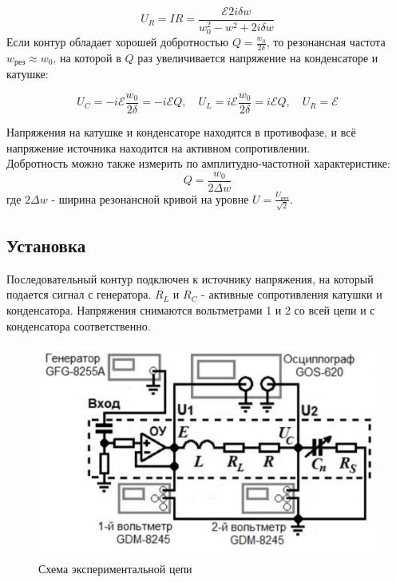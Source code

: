 \documentclass[a4paper, 12pt]{article}
\begin{document}
\begin{equation}
    U_R = IR = \frac{\mathcal{E} 2i\delta w}{w_0^2 - w^2 + 2i\delta w}
\end{equation}
Если контур обладает хорошей добротностью $Q = \frac{w_0}{2\delta}$, то резонансная частота $w_\text{рез} \approx w_0$, на которой в $Q$ раз увеличивается напряжение на конденсаторе и катушке:

\begin{equation}
    U_C = -i\mathcal{E} \frac{w_0}{2\delta} = -i\mathcal{E} Q, \quad U_L = i\mathcal{E} \frac{w_0}{2\delta} = i\mathcal{E} Q, \quad U_R = \mathcal{E}
\end{equation}

Напряжения на катушке и конденсаторе находятся в противофазе, и всё напряжение источника находится на активном сопротивлении.\\
Добротность можно также измерить по амплитудно-частотной характеристике: \[Q = \frac{w_0}{2\Delta w}\] где $2\Delta w$ - ширина резонансной кривой на уровне $U = \frac{U_{\text{рез}}}{\sqrt{2}}$.

\newpage

\subsection*{Установка}
Последовательный контур подключен к источнику напряжения, на который подается сигнал с генератора.
$R_L$ и $R_C$ - активные сопротивления катушки и конденсатора. Напряжения снимаются вольтметрами 1 и 2 со всей цепи и с конденсатора соответственно.

\begin{figure}[H]
    \centering
    \includegraphics[width = 18cm]{setup.png}
    \caption{Схема экспериментальной цепи}
\end{figure}
\end{document}
